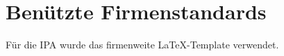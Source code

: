 \chapter{Benützte Firmenstandards}\label{ch:benuetzte-firmenstandards}
Für die IPA wurde das firmenweite LaTeX-Template verwendet.

